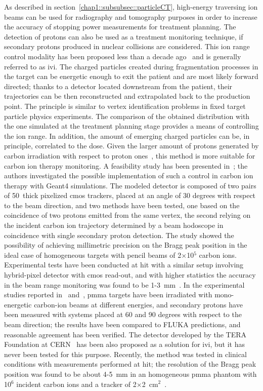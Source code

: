 As described in section~\ref{chap1::subsubsec::particleCT}, high-energy traversing ion beams can be used for radiography and tomography purposes in order to increase the accuracy of stopping power measurements for treatment planning. The detection of protons can also be used as a treatment monitoring technique, if secondary protons produced in nuclear collisions are considered. This ion range control modality has been proposed less than a decade ago~\parencite{Dauvergne2009, Amaldi2010b} and is generally referred to as \gls{ivi}. The charged particles created during fragmentation processes in the target can be energetic enough to exit the patient and are most likely forward directed; thanks to a detector located downstream from the patient, their trajectories can be then reconstructed and extrapolated back to the production point. The principle is similar to vertex identification problems in fixed target particle physics experiments. The comparison of the obtained distribution with the one simulated at the treatment planning stage provides a means of controlling the ion range. In addition, the amount of emerging charged particles can be, in principle, correlated to the dose. Given the larger amount of protons generated by carbon irradiation with respect to proton ones~\parencite{Gunzert-Marx2008}, this method is more suitable for carbon ion therapy monitoring.  
A feasibility study has been presented in~\cite{Henriquet2012}; the authors investigated the possible implementation of such a control in carbon ion therapy with Geant4 simulations. The modeled detector is composed of two pairs of 50~\charmum thick pixelized \gls{cmos} trackers, placed at an angle of 30 degrees with respect to the beam direction, and two methods have been tested, one based on the coincidence of two protons emitted from the same vertex, the second relying on the incident carbon ion trajectory determined by a beam hodoscope in coincidence with single secondary proton detection. The study showed the possibility of achieving millimetric precision on the Bragg peak position in the ideal case of homogeneous targets with pencil beams of 2$\times$10$^5$ carbon ions. Experimental tests have been conducted at \gls{hit} with a similar setup involving hybrid-pixel detector with \gls{cmos} read-out, and with higher statistics the accuracy in the beam range monitoring was found to be 1-3~mm~\parencite{Gwosch2013}. In the experimental studies reported in~\cite{Agodi2012} and~\cite{Piersanti2014}, \gls{pmma} targets have been irradiated with mono-energetic carbon-ion beams at different energies, and secondary protons have been measured with systems placed at 60 and 90 degrees with respect to the beam direction; the results have been compared to FLUKA predictions, and reasonable agreement has been verified. The detector developed by the TERA Foundation at CERN~\parencite{BucciantonioPhD2015} has been also proposed as a solution for \gls{ivi}, but it has never been tested for this purpose. Recently, the method was tested in clinical conditions with measurements performed at \gls{hit}; the resolution of the Bragg peak position was found to be about 4-5~mm in an homogeneous \gls{pmma} phantom with 10$^6$ incident carbon ions and a tracker of 2$\times$2~cm$^{2}$~\parencite{Finck2017}.
